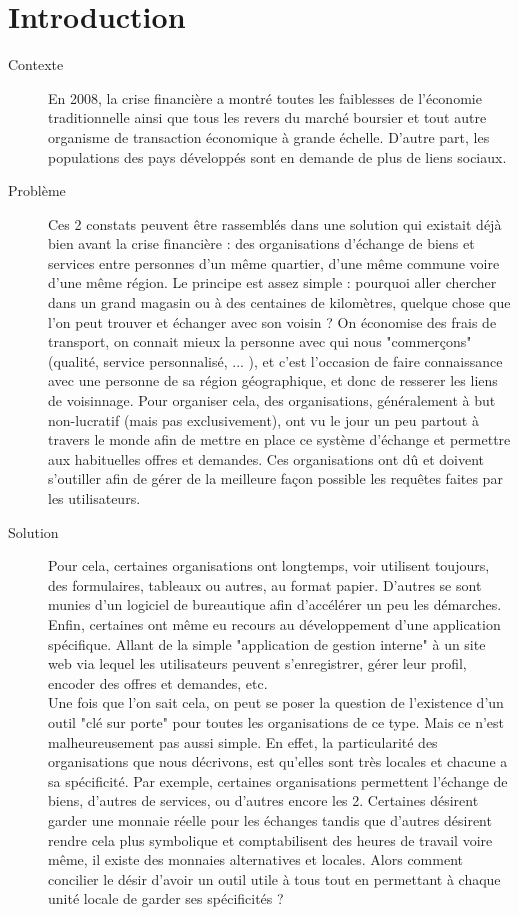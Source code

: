 \newpage
\setcounter{page}{1}
\section{Introduction}

\begin{description}

\item[Contexte] 
En 2008,  la crise financière a montré toutes les faiblesses de l'économie traditionnelle ainsi que tous les revers du marché boursier et tout autre organisme de transaction économique à grande échelle.  D'autre part,  les populations des pays développés sont en demande de plus de liens sociaux.  

\item[Problème] 
Ces 2 constats peuvent être rassemblés dans une solution qui existait déjà bien avant la crise financière : des organisations d'échange de biens et services entre personnes d'un même quartier,  d'une même commune voire d'une même région.  Le principe est assez simple : pourquoi aller chercher dans un grand magasin ou à des centaines de kilomètres,  quelque chose que l'on peut trouver et échanger avec son voisin ?  On économise des frais de transport,  on connait mieux la personne avec qui nous "commerçons" (qualité,  service personnalisé, ... ),  et c'est l'occasion de faire connaissance avec une personne de sa région géographique,  et donc de resserer les liens de voisinnage.  Pour organiser cela,  des organisations,   généralement à but non-lucratif (mais pas exclusivement),  ont vu le jour un peu partout à travers le monde afin de mettre en place ce système d'échange et permettre aux habituelles offres et demandes.  Ces organisations ont dû et doivent s'outiller afin de gérer de la meilleure façon possible les requêtes faites par les utilisateurs.  

\item[Solution] 
Pour cela,  certaines organisations ont longtemps,  voir utilisent toujours,  des formulaires, tableaux ou autres,  au format papier.  D'autres se sont munies d'un logiciel de bureautique afin d'accélérer un peu les démarches.  Enfin,  certaines ont même eu recours au développement d'une application spécifique.  Allant de la simple "application de gestion interne" à un site web via lequel les utilisateurs peuvent s'enregistrer,  gérer leur profil,  encoder des offres et demandes,  etc.   
\\
Une fois que l'on sait cela,  on peut se poser la question de l'existence d'un outil "clé sur porte" pour toutes les organisations de ce type.  Mais ce n'est malheureusement pas aussi simple.  En effet,  la particularité des organisations que nous décrivons,  est qu'elles sont très locales et chacune a sa spécificité.  Par exemple,  certaines organisations permettent l'échange de biens,  d'autres de services,  ou d'autres encore les 2.  Certaines désirent garder une monnaie réelle pour les échanges tandis que d'autres désirent rendre cela plus symbolique et comptabilisent des heures de travail voire même,  il existe des monnaies alternatives et locales.  Alors comment concilier le désir d'avoir un outil utile à tous tout en permettant à chaque unité locale de garder ses spécificités ?  


\end{description}
